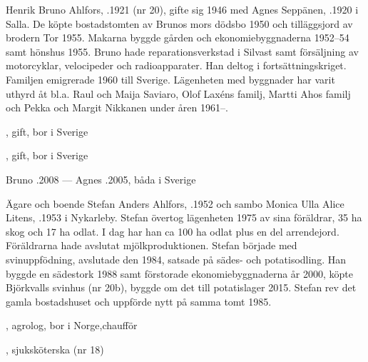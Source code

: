 Henrik Bruno Ahlfors, .1921 (nr 20), gifte sig 1946 med Agnes Seppänen, .1920 i Salla. De köpte bostadstomten av Brunos mors dödsbo 1950 och tilläggsjord av brodern Tor 1955. Makarna byggde gården och ekonomiebyggnaderna 1952--54 samt hönshus 1955. Bruno hade reparationsverkstad i Silvast samt försäljning av motorcyklar, velocipeder och radioapparater. Han deltog i fortsättningskriget. Familjen emigrerade 1960 till Sverige.  Lägenheten med byggnader har varit uthyrd  åt bl.a. Raul och Maija Saviaro, Olof Laxéns familj, Martti Ahos familj och Pekka och Margit Nikkanen under åren 1961--.
\begin{jhchildren}
  \item {}, gift, bor i Sverige
  \item {}, gift, bor i Sverige
\end{jhchildren}

Bruno .2008  ---  Agnes .2005, båda i Sverige






Ägare och boende Stefan Anders Ahlfors, .1952 och sambo Monica Ulla Alice Litens, .1953 i Nykarleby. Stefan övertog lägenheten 1975 av sina föräldrar, 35 ha skog och 17 ha odlat. I dag har han ca 100 ha odlat plus en del arrendejord. Föräldrarna hade avslutat mjölkproduktionen. Stefan började med svinuppfödning, avslutade den 1984, satsade på sädes- och potatisodling. Han byggde en sädestork 1988 samt förstorade ekonomiebyggnaderna år 2000, köpte Björkvalls svinhus (nr 20b), byggde om det till potatislager 2015.
Stefan rev det gamla bostadshuset och uppförde nytt på samma tomt 1985.
\begin{jhchildren}
  \item {}, agrolog, bor i Norge,chaufför
  \item {}, sjuksköterska (nr 18)
\end{jhchildren}



